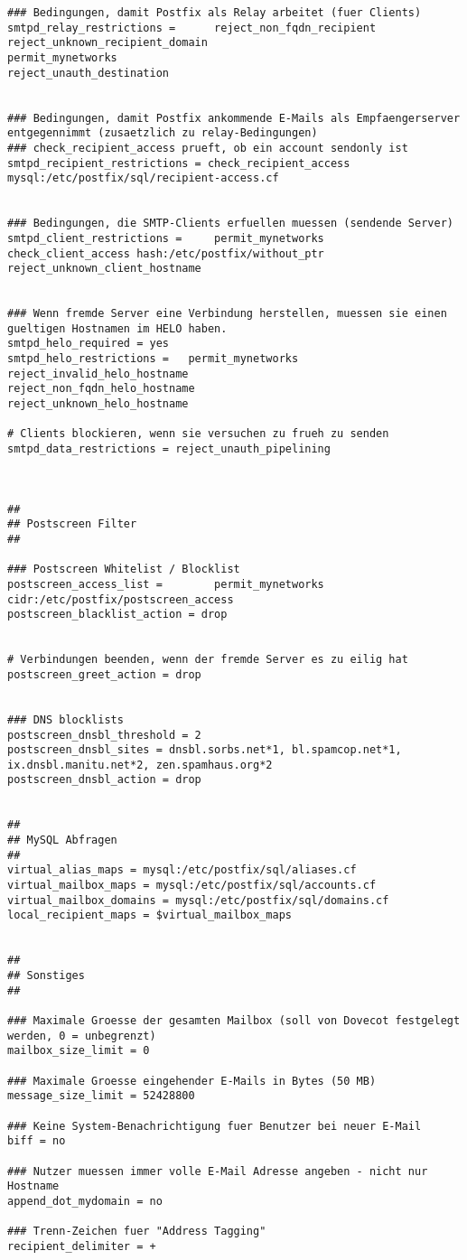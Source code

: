 \begin{lstlisting}[caption=main.cf - Postfix]
### Bedingungen, damit Postfix als Relay arbeitet (fuer Clients)
smtpd_relay_restrictions =      reject_non_fqdn_recipient
reject_unknown_recipient_domain
permit_mynetworks
reject_unauth_destination


### Bedingungen, damit Postfix ankommende E-Mails als Empfaengerserver entgegennimmt (zusaetzlich zu relay-Bedingungen)
### check_recipient_access prueft, ob ein account sendonly ist
smtpd_recipient_restrictions = check_recipient_access mysql:/etc/postfix/sql/recipient-access.cf


### Bedingungen, die SMTP-Clients erfuellen muessen (sendende Server)
smtpd_client_restrictions =     permit_mynetworks
check_client_access hash:/etc/postfix/without_ptr
reject_unknown_client_hostname


### Wenn fremde Server eine Verbindung herstellen, muessen sie einen gueltigen Hostnamen im HELO haben.
smtpd_helo_required = yes
smtpd_helo_restrictions =   permit_mynetworks
reject_invalid_helo_hostname
reject_non_fqdn_helo_hostname
reject_unknown_helo_hostname

# Clients blockieren, wenn sie versuchen zu frueh zu senden
smtpd_data_restrictions = reject_unauth_pipelining



##
## Postscreen Filter
##

### Postscreen Whitelist / Blocklist
postscreen_access_list =        permit_mynetworks
cidr:/etc/postfix/postscreen_access
postscreen_blacklist_action = drop


# Verbindungen beenden, wenn der fremde Server es zu eilig hat
postscreen_greet_action = drop


### DNS blocklists
postscreen_dnsbl_threshold = 2
postscreen_dnsbl_sites = dnsbl.sorbs.net*1, bl.spamcop.net*1, ix.dnsbl.manitu.net*2, zen.spamhaus.org*2
postscreen_dnsbl_action = drop


##
## MySQL Abfragen
##
virtual_alias_maps = mysql:/etc/postfix/sql/aliases.cf
virtual_mailbox_maps = mysql:/etc/postfix/sql/accounts.cf
virtual_mailbox_domains = mysql:/etc/postfix/sql/domains.cf
local_recipient_maps = $virtual_mailbox_maps


##
## Sonstiges
##

### Maximale Groesse der gesamten Mailbox (soll von Dovecot festgelegt werden, 0 = unbegrenzt)
mailbox_size_limit = 0

### Maximale Groesse eingehender E-Mails in Bytes (50 MB)
message_size_limit = 52428800

### Keine System-Benachrichtigung fuer Benutzer bei neuer E-Mail
biff = no

### Nutzer muessen immer volle E-Mail Adresse angeben - nicht nur Hostname
append_dot_mydomain = no

### Trenn-Zeichen fuer "Address Tagging"
recipient_delimiter = +
\end{lstlisting}

